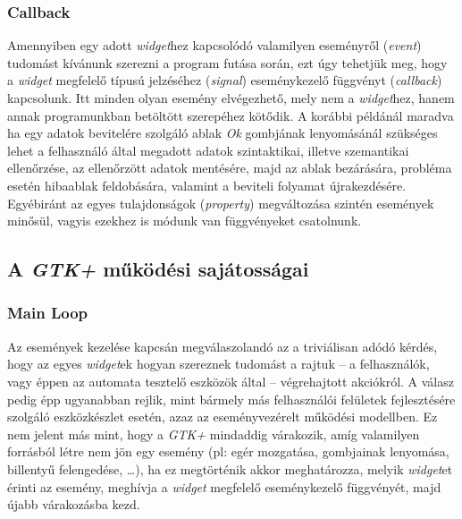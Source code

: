 \subsubsection{Callback}

Amennyiben egy adott \textit{widget}hez kapcsolódó valamilyen eseményről (\textit{event}) tudomást kívánunk szerezni a program futása során, ezt úgy tehetjük meg, hogy a \textit{widget} megfelelő típusú jelzéséhez (\textit{signal}) eseménykezelő függvényt (\textit{callback}) kapcsolunk. Itt minden olyan esemény elvégezhető, mely nem a \textit{widget}hez, hanem annak programunkban betöltött szerepéhez kötődik. A korábbi példánál maradva ha egy adatok bevitelére szolgáló ablak \textit{Ok} gombjának lenyomásánál szükséges lehet a felhasználó által megadott adatok szintaktikai, illetve szemantikai ellenőrzése, az ellenőrzött adatok mentésére, majd az ablak bezárására, probléma esetén hibaablak feldobására, valamint a beviteli folyamat újrakezdésére.  Egyébiránt az egyes tulajdonságok (\textit{property}) megváltozása szintén események minősül, vagyis ezekhez is módunk van függvényeket csatolnunk.

\subsection{A \textit{GTK+} működési sajátosságai}

\subsubsection{Main Loop}
\label{sec:mainloop}

Az események kezelése kapcsán megválaszolandó az a triviálisan adódó kérdés, hogy az egyes \textit{widget}ek hogyan szereznek tudomást a rajtuk -- a felhasználók, vagy éppen az automata tesztelő eszközök által -- végrehajtott akciókról. A válasz pedig épp ugyanabban rejlik, mint bármely más felhasználói felületek fejlesztésére szolgáló eszközkészlet esetén, azaz az eseményvezérelt működési modellben. Ez nem jelent más mint, hogy a \textit{GTK+} mindaddig várakozik, amíg valamilyen forrásból létre nem jön egy esemény (pl: egér mozgatása, gombjainak lenyomása, billentyű felengedése, \dots), ha ez megtörténik akkor meghatározza, melyik \textit{widget}et érinti az esemény, meghívja a \textit{widget} megfelelő eseménykezelő függvényét, majd újabb várakozásba kezd.

